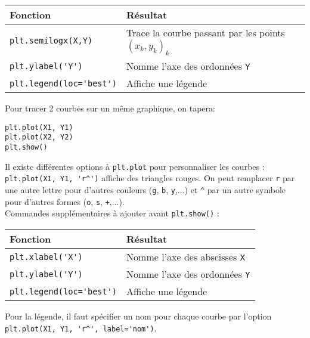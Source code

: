 \documentclass[11pt,a4paper]{article}
\begin{document}
\begin{tabular}{|l|l|}
\hline
Fonction & Résultat \\
\hline
\verb|plt.semilogx(X,Y)| & Trace la courbe passant par les points $(x_k,y_k)_k$ \\ 
\verb|plt.ylabel('Y')| & Nomme l'axe des ordonnées \verb|Y|\\
\verb|plt.legend(loc='best')| & Affiche une légende \\
\hline
\end{tabular}
\newline

Pour tracer 2 courbes sur un même graphique, on tapera:
\begin{verbatim}
plt.plot(X1, Y1)
plt.plot(X2, Y2)
plt.show()
\end{verbatim}

Il existe différentes options à \verb|plt.plot| pour personnaliser les courbes : \verb|plt.plot(X1, Y1, 'r^')| affiche des triangles rouges. On peut remplacer \verb|r| par une autre lettre pour d'autres couleurs (\verb|g|, \verb|b|, \verb|y|,...) et \verb|^| par un autre symbole pour d'autres formes (\verb|o|, \verb|s|, \verb|+|,...).\\

Commandes supplémentaires à ajouter avant \verb|plt.show()| : \\

\begin{tabular}{|l|l|}
\hline
Fonction & Résultat \\
\hline
\verb|plt.xlabel('X')| & Nomme l'axe des abscisses \verb|X| \\ 
\verb|plt.ylabel('Y')| & Nomme l'axe des ordonnées \verb|Y|\\
\verb|plt.legend(loc='best')| & Affiche une légende \\
\hline
\end{tabular}
\newline

Pour la légende, il faut spécifier un nom pour chaque courbe par l'option \linebreak \verb|plt.plot(X1, Y1, 'r^', label='nom')|.
\end{document}
